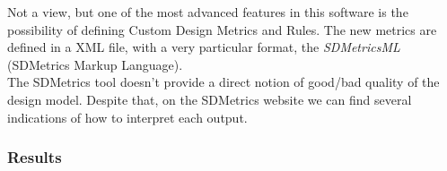 Not a view, but one of the most advanced features in this software is the possibility of defining Custom Design Metrics and Rules. The new metrics are defined in a XML file, with a very particular format, the \textit{SDMetricsML} (SDMetrics Markup Language). \\
The SDMetrics tool doesn't provide a direct notion of good/bad quality of the design model. Despite that, on the SDMetrics website we can find several indications of how to interpret each output. 
 
\subsubsection{Results}